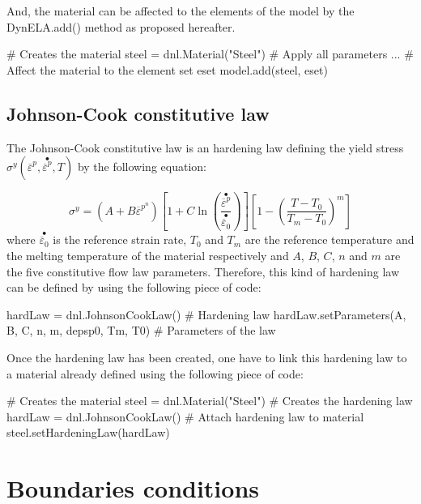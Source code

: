 And, the material can be affected to the elements of the model by the \textsf{DynELA.add()} method as proposed hereafter.

\begin{PythonListing}
# Creates the material
steel = dnl.Material("Steel")
# Apply all parameters
...
# Affect the material to the element set eset
model.add(steel, eset)
\end{PythonListing}

\subsection{Johnson-Cook constitutive law}

The Johnson-Cook constitutive law is an hardening law defining the yield stress $\sigma^{y}(\overline{\varepsilon}^{p},\stackrel{\bullet}{\overline{\varepsilon}^{p}},T)$ by the following equation:

\begin{equation}
\sigma^{y}=\left(A+B\overline{\varepsilon}^{p^{n}}\right)\left[1+C\ln\left(\frac{\stackrel{\bullet}{\overline{\varepsilon}^{p}}}{\stackrel{\bullet}{\overline{\varepsilon}_{0}}}\right)\right]\left[1-\left(\frac{T-T_{0}}{T_{m}-T_{0}}\right)^{m}\right]
\end{equation}
where $\stackrel{\bullet}{\overline{\varepsilon}_{0}}$ is the reference strain rate, $T_{0}$ and $T_{m}$ are the reference temperature and the melting temperature of the material respectively and $A$, $B$, $C$, $n$ and $m$ are the five constitutive flow law parameters. Therefore, this kind of hardening law can be defined by using the following piece of code:

\begin{PythonListing}
hardLaw = dnl.JohnsonCookLaw()                       # Hardening law
hardLaw.setParameters(A, B, C, n, m, depsp0, Tm, T0) # Parameters of the law
\end{PythonListing}

Once the hardening law has been created, one have to link this hardening law to a material already defined using the following piece of code:

\begin{PythonListing}
# Creates the material
steel = dnl.Material("Steel")
# Creates the hardening law
hardLaw = dnl.JohnsonCookLaw()
# Attach hardening law to material
steel.setHardeningLaw(hardLaw)
\end{PythonListing}

\section{Boundaries conditions}

